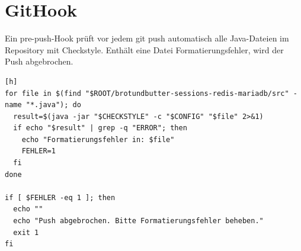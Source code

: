 \section{GitHook}

Ein pre-push-Hook prüft vor jedem git push automatisch alle Java-Dateien im Repository mit Checkstyle. Enthält eine Datei Formatierungsfehler, wird der Push abgebrochen.

\begin{verbatim}[h]
for file in $(find "$ROOT/brotundbutter-sessions-redis-mariadb/src" -name "*.java"); do
  result=$(java -jar "$CHECKSTYLE" -c "$CONFIG" "$file" 2>&1)
  if echo "$result" | grep -q "ERROR"; then
    echo "Formatierungsfehler in: $file"
    FEHLER=1
  fi
done

if [ $FEHLER -eq 1 ]; then
  echo ""
  echo "Push abgebrochen. Bitte Formatierungsfehler beheben."
  exit 1
fi
\end{verbatim}


